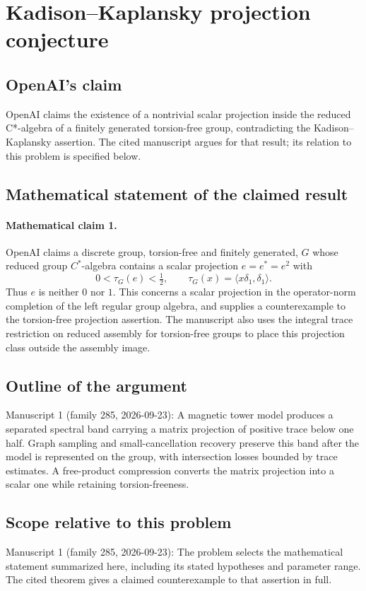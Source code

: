 \documentclass[11pt]{article}
\begin{document}
\section*{Kadison–Kaplansky projection conjecture}

\subsection{OpenAI's claim}
OpenAI claims the existence of a nontrivial scalar projection inside the reduced C*-algebra of a finitely generated torsion-free group, contradicting the Kadison--Kaplansky assertion. The cited manuscript argues for that result; its relation to this problem is specified below.

\subsection{Mathematical statement of the claimed result}
\paragraph{Mathematical claim 1.} OpenAI claims a discrete group, torsion-free and finitely generated, $G$ whose reduced group $C^*$-algebra contains a scalar projection $e=e^*=e^2$ with
\[
0<\tau_G(e)<\tfrac12,\qquad\tau_G(x)=\langle x\delta_1,\delta_1\rangle.
\]
Thus $e$ is neither $0$ nor $1$. This concerns a scalar projection in the operator-norm completion of the left regular group algebra, and supplies a counterexample to the torsion-free projection assertion. The manuscript also uses the integral trace restriction on reduced assembly for torsion-free groups to place this projection class outside the assembly image.

\subsection{Outline of the argument}
Manuscript 1 (family 285, 2026-09-23): A magnetic tower model produces a separated spectral band carrying a matrix projection of positive trace below one half. Graph sampling and small-cancellation recovery preserve this band after the model is represented on the group, with intersection losses bounded by trace estimates. A free-product compression converts the matrix projection into a scalar one while retaining torsion-freeness.

\subsection{Scope relative to this problem}
Manuscript 1 (family 285, 2026-09-23): The problem selects the mathematical statement summarized here, including its stated hypotheses and parameter range. The cited theorem gives a claimed counterexample to that assertion in full.
\end{document}
